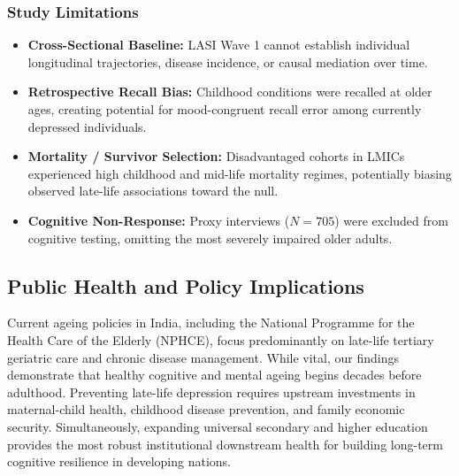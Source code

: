 \documentclass[11pt,a4paper]{article}
\begin{document}
\subsubsection{Study Limitations}
\begin{itemize}
    \item \textbf{Cross-Sectional Baseline:} LASI Wave 1 cannot establish individual longitudinal trajectories, disease incidence, or causal mediation over time.
    \item \textbf{Retrospective Recall Bias:} Childhood conditions were recalled at older ages, creating potential for mood-congruent recall error among currently depressed individuals.
    \item \textbf{Mortality / Survivor Selection:} Disadvantaged cohorts in LMICs experienced high childhood and mid-life mortality regimes, potentially biasing observed late-life associations toward the null.
    \item \textbf{Cognitive Non-Response:} Proxy interviews ($N = 705$) were excluded from cognitive testing, omitting the most severely impaired older adults.
\end{itemize}

\subsection{Public Health and Policy Implications}
Current ageing policies in India, including the National Programme for the Health Care of the Elderly (NPHCE), focus predominantly on late-life tertiary geriatric care and chronic disease management. While vital, our findings demonstrate that healthy cognitive and mental ageing begins decades before adulthood. Preventing late-life depression requires upstream investments in maternal-child health, childhood disease prevention, and family economic security. Simultaneously, expanding universal secondary and higher education provides the most robust institutional downstream health for building long-term cognitive resilience in developing nations.
\end{document}
